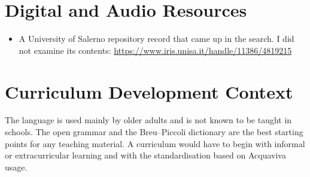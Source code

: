 \documentclass[12pt]{article}
\begin{document}
\section{Digital and Audio Resources}
\begin{itemize}
\item A University of Salerno repository record that came up in the search. I did not examine its contents: \url{https://www.iris.unisa.it/handle/11386/4819215}
\end{itemize}

\section{Curriculum Development Context}
The language is used mainly by older adults and is not known to be taught in schools. The open grammar and the Breu--Piccoli dictionary are the best starting points for any teaching material. A curriculum would have to begin with informal or extracurricular learning and with the standardisation based on Acquaviva usage.
\end{document}
